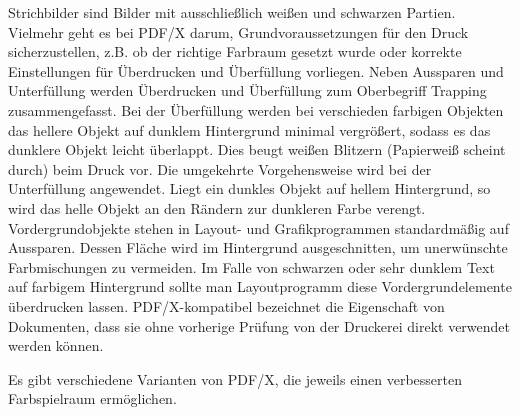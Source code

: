 Strichbilder sind Bilder mit ausschließlich weißen und schwarzen Partien. \cite{strich} Vielmehr geht es bei PDF/X darum, Grundvoraussetzungen für den Druck sicherzustellen, z.B. ob der richtige Farbraum gesetzt wurde oder korrekte Einstellungen für Überdrucken und Überfüllung vorliegen. Neben Aussparen und Unterfüllung werden Überdrucken und Überfüllung zum Oberbegriff Trapping zusammengefasst. Bei der Überfüllung werden bei verschieden farbigen Objekten das hellere Objekt auf dunklem Hintergrund minimal vergrößert, sodass es das dunklere Objekt leicht überlappt. Dies beugt weißen Blitzern (Papierweiß scheint durch) beim Druck vor. Die umgekehrte Vorgehensweise wird bei der Unterfüllung angewendet. Liegt ein dunkles Objekt auf hellem Hintergrund, so wird das helle Objekt an den Rändern zur dunkleren Farbe verengt. Vordergrundobjekte stehen in Layout- und Grafikprogrammen standardmäßig auf Aussparen. Dessen Fläche wird im Hintergrund ausgeschnitten, um unerwünschte Farbmischungen zu vermeiden. Im Falle von schwarzen oder sehr dunklem Text auf farbigem Hintergrund sollte man Layoutprogramm diese Vordergrundelemente überdrucken lassen. \cite{kompendium} PDF/X-kompatibel bezeichnet die Eigenschaft von Dokumenten, dass sie ohne vorherige Prüfung von der Druckerei direkt verwendet werden können. \cite{adobe-pdf-x}
\par
Es gibt verschiedene Varianten von PDF/X, die jeweils einen verbesserten Farbspielraum ermöglichen. 

